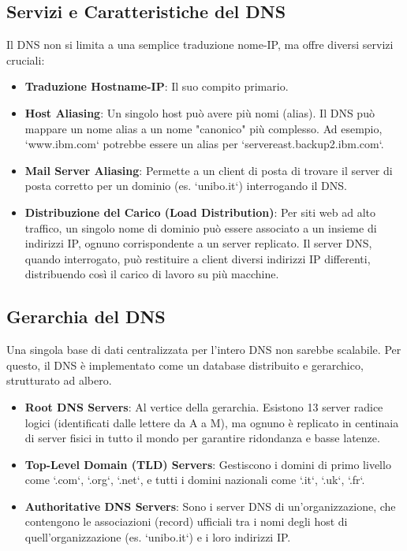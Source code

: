 \subsection{Servizi e Caratteristiche del DNS}
Il DNS non si limita a una semplice traduzione nome-IP, ma offre diversi servizi cruciali:
\begin{itemize}
    \item \textbf{Traduzione Hostname-IP}: Il suo compito primario.
    \item \textbf{Host Aliasing}: Un singolo host può avere più nomi (alias). Il DNS può mappare un nome alias a un nome "canonico" più complesso. Ad esempio, `www.ibm.com` potrebbe essere un alias per `servereast.backup2.ibm.com`.
    \item \textbf{Mail Server Aliasing}: Permette a un client di posta di trovare il server di posta corretto per un dominio (es. `unibo.it`) interrogando il DNS.
    \item \textbf{Distribuzione del Carico (Load Distribution)}: Per siti web ad alto traffico, un singolo nome di dominio può essere associato a un insieme di indirizzi IP, ognuno corrispondente a un server replicato. Il server DNS, quando interrogato, può restituire a client diversi indirizzi IP differenti, distribuendo così il carico di lavoro su più macchine.
\end{itemize}


\subsection{Gerarchia del DNS}
Una singola base di dati centralizzata per l'intero DNS non sarebbe scalabile. Per questo, il DNS è implementato come un database distribuito e gerarchico, strutturato ad albero.
\begin{itemize}
    \item \textbf{Root DNS Servers}: Al vertice della gerarchia. Esistono 13 server radice logici (identificati dalle lettere da A a M), ma ognuno è replicato in centinaia di server fisici in tutto il mondo per garantire ridondanza e basse latenze.
    \item \textbf{Top-Level Domain (TLD) Servers}: Gestiscono i domini di primo livello come `.com`, `.org`, `.net`, e tutti i domini nazionali come `.it`, `.uk`, `.fr`.
    \item \textbf{Authoritative DNS Servers}: Sono i server DNS di un'organizzazione, che contengono le associazioni (record) ufficiali tra i nomi degli host di quell'organizzazione (es. `unibo.it`) e i loro indirizzi IP.
\end{itemize}

